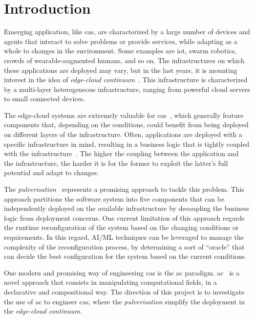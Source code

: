 \documentclass[12pt]{article}
\begin{document}
\section{Introduction}\label{sec:introduction}

Emerging application,
like \ac{cas},
are characterized by a large number of devices and agents
that interact to solve problems or provide services,
while adapting as a whole to changes in the environment.
%
Some examples are \ac{iot}, swarm robotics, crowds of wearable-augmented humans, and so on.
%
The infrastructures on which these applications are deployed may vary,
but in the last years, it is mounting interest in the idea of \emph{edge-cloud continuum}~\cite{DBLP:journals/iot/BittencourtISFM18}.
%
This infrastructure is characterized by a multi-layer heterogeneous infrastructure,
ranging from powerful cloud servers to small connected devices.

The edge-cloud systems are extremely valuable for \ac{cas}~\cite{DBLP:journals/tpds/HongCHGZ19,DBLP:journals/comsur/WangZZMLW20,DBLP:journals/comsur/AfrinJRRWH21,DBLP:journals/iotj/CasadeiFPPSV22},
which generally feature components that, depending on the conditions,
could benefit from being deployed on different layers of the infrastructure.
%
Often,
applications are deployed with a specific infrastructure in mind,
resulting in a business logic that is tightly coupled with the infrastructure~\cite{Spolsky2004}.
%
The higher the coupling between the application and the infrastructure,
the harder it is for the former to exploit the latter's full potential and adapt to changes.

The \emph{pulverisation}~\cite{DBLP:journals/fi/CasadeiPPVW20} represents a promising approach to tackle this problem.
%
This approach partitions the software system into five components that can be independently deployed on the available infrastructure
by decoupling the business logic from deployment concerns.
%
One current limitation of this approach regards the runtime reconfiguration of the system based on the changing conditions or requirements.
%
In this regard,
AI/ML techniques can be leveraged to manage the complexity of the reconfiguration process,
by determining a sort of ``oracle'' that can decide the best configuration for the system based on the current conditions.

One modern and promising way of engineering \ac{cas} is the \ac{ac} paradigm.
%
\ac{ac}~\cite{DBLP:journals/computer/BealPV15} is a novel approach that consists in manipulating computational fields,
in a declarative and compositional way.
%
The direction of this project is to investigate the use of \ac{ac} to engineer \ac{cas},
where the \emph{pulverisation} simplify the deployment in the \emph{edge-cloud continuum}.
\end{document}
